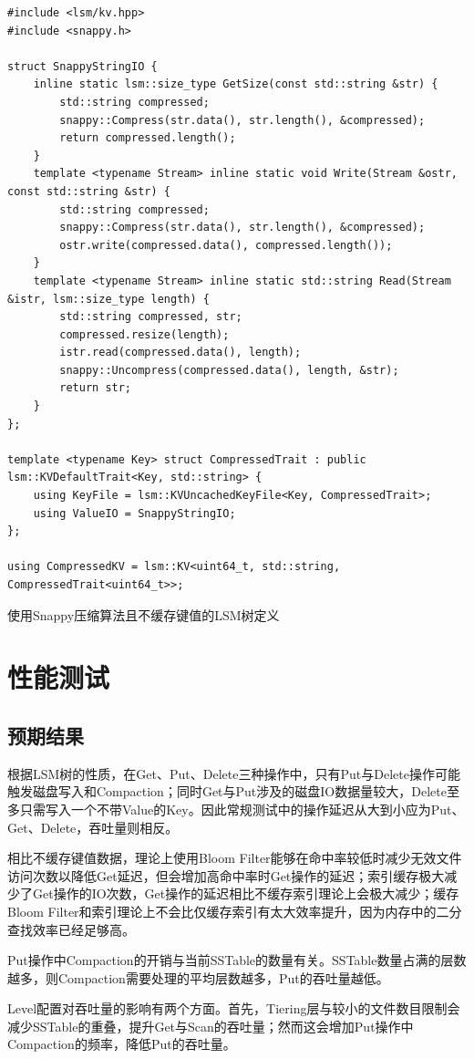 \documentclass[a4paper,UTF8]{ctexart}
\newenvironment{code}{\captionsetup{type=listing}}{}
\begin{document}
\begin{code}
	\begin{verbatim}
#include <lsm/kv.hpp>
#include <snappy.h>

struct SnappyStringIO {
	inline static lsm::size_type GetSize(const std::string &str) {
		std::string compressed;
		snappy::Compress(str.data(), str.length(), &compressed);
		return compressed.length();
	}
	template <typename Stream> inline static void Write(Stream &ostr, const std::string &str) {
		std::string compressed;
		snappy::Compress(str.data(), str.length(), &compressed);
		ostr.write(compressed.data(), compressed.length());
	}
	template <typename Stream> inline static std::string Read(Stream &istr, lsm::size_type length) {
		std::string compressed, str;
		compressed.resize(length);
		istr.read(compressed.data(), length);
		snappy::Uncompress(compressed.data(), length, &str);
		return str;
	}
};

template <typename Key> struct CompressedTrait : public lsm::KVDefaultTrait<Key, std::string> {
	using KeyFile = lsm::KVUncachedKeyFile<Key, CompressedTrait>;
	using ValueIO = SnappyStringIO;
};

using CompressedKV = lsm::KV<uint64_t, std::string, CompressedTrait<uint64_t>>;
	\end{verbatim}
	\caption{使用Snappy压缩算法且不缓存键值的LSM树定义}
	\label{lst:CompressedKVDef}
\end{code}


\section{性能测试}


\subsection{预期结果}


根据LSM树的性质，在Get、Put、Delete三种操作中，只有Put与Delete操作可能触发磁盘写入和Compaction；同时Get与Put涉及的磁盘IO数据量较大，Delete至多只需写入一个不带Value的Key。因此常规测试中的操作延迟从大到小应为Put、Get、Delete，吞吐量则相反。
\par
相比不缓存键值数据，理论上使用Bloom Filter能够在命中率较低时减少无效文件访问次数以降低Get延迟，但会增加高命中率时Get操作的延迟；索引缓存极大减少了Get操作的IO次数，Get操作的延迟相比不缓存索引理论上会极大减少；缓存Bloom Filter和索引理论上不会比仅缓存索引有太大效率提升，因为内存中的二分查找效率已经足够高。
\par
Put操作中Compaction的开销与当前SSTable的数量有关。SSTable数量占满的层数越多，则Compaction需要处理的平均层数越多，Put的吞吐量越低。
\par
Level配置对吞吐量的影响有两个方面。首先，Tiering层与较小的文件数目限制会减少SSTable的重叠，提升Get与Scan的吞吐量；然而这会增加Put操作中Compaction的频率，降低Put的吞吐量。
\end{document}
